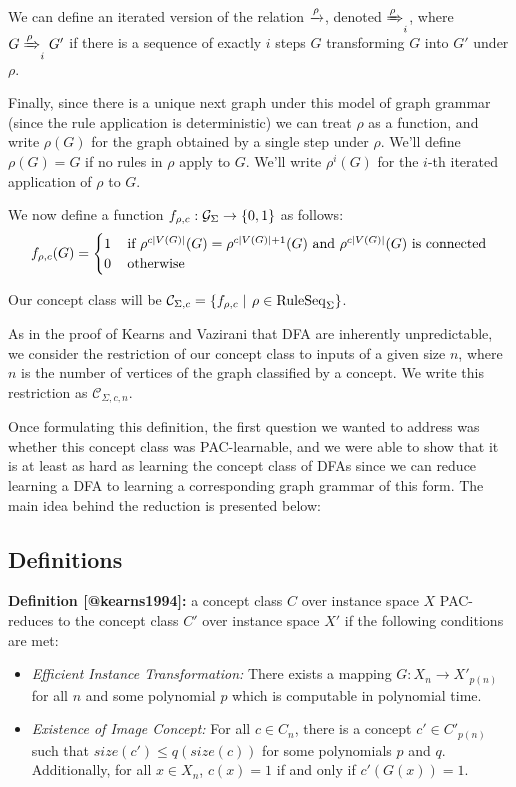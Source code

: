 \documentclass[]{article}
\providecommand{\tightlist}{%
  \setlength{\itemsep}{0pt}\setlength{\parskip}{0pt}}
\def\RuleSeq{\mathrm{RuleSeq}\xspace}
\def\Graphs{\mathcal{G}\xspace}
\def\Concepts{\mathcal{C}\xspace}
\begin{document}
We can define an iterated version of the relation $\xrightarrow{\rho}$, denoted $\xRightarrow{\rho}_i$, where $G \xRightarrow{\rho}_i G'$ if there is a sequence of exactly $i$ steps $G$ transforming $G$ into $G'$ under $\rho$.

Finally, since there is a unique next graph under this model of graph grammar (since the rule application is deterministic) we can treat $\rho$ as a function, and write $\rho(G)$ for the graph obtained by a single step under $\rho$. We'll define $\rho(G) =G$ if no rules in $\rho$ apply to $G$. We'll write $\rho^i(G)$ for the $i$-th iterated application of $\rho$ to $G$.

We now define a function $f_{\rho,c} : \Graphs_{\Sigma} \to \Set{0,1}$ as follows:
\[f_{\rho,c}(G) = \begin{cases}
    1 &\,\text{if $\rho^{c\left| V(G) \right|}(G) = \rho^{c\left| V(G) \right|+1}(G)$ and $\rho^{c\left| V(G) \right|}(G)$ is connected}\\
    0 &\,\text{otherwise}
  \end{cases}\]

Our concept class will be
\(\Concepts_{\Sigma,c} = \Setbar{f_{\rho,c}}{\rho\in \RuleSeq_\Sigma}\).

As in the proof of Kearns and Vazirani that DFA are inherently unpredictable, we consider the restriction of our concept class to inputs of a given size $n$, where $n$ is the number of vertices of the graph classified by a concept. We write this restriction as $\Concepts_{\Sigma,c,n}$.

Once formulating this definition, the first question we wanted to address was whether this concept class was PAC-learnable, and we were able to show that it is at least as hard as learning the concept class of DFAs since we can reduce learning a DFA to learning a corresponding graph grammar of this form. The main idea behind the reduction is presented below:

\subsection{Definitions}\label{definitions}

\textbf{Definition {[}@kearns1994{]}:} a concept class \(C\) over
instance space \(X\) PAC-reduces to the concept class \(C'\) over
instance space \(X'\) if the following conditions are met:

\begin{itemize}
\tightlist
\item
  \emph{Efficient Instance Transformation:} There exists a mapping
  \(G: X_n \to X'_{p(n)}\) for all \(n\) and some polynomial \(p\) which
  is computable in polynomial time.
\item
  \emph{Existence of Image Concept:} For all \(c \in C_n\), there is a
  concept \(c' \in C'_{p(n)}\) such that \(size(c') \leq q(size(c))\)
  for some polynomials \(p\) and \(q\). Additionally, for all
  \(x \in X_n\), \(c(x) = 1\) if and only if \(c'(G(x)) = 1\).
\end{itemize}
\end{document}
